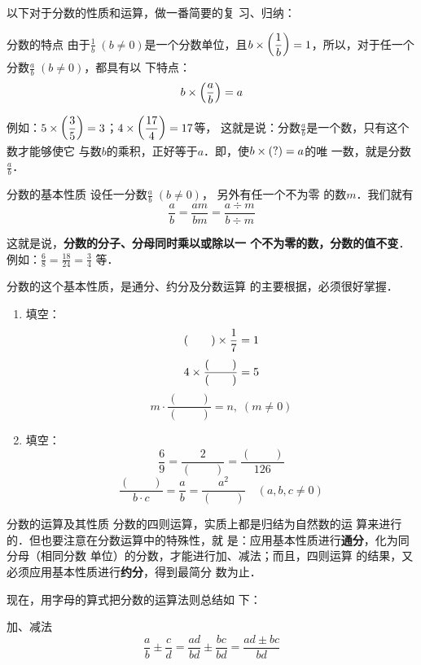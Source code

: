 以下对于分数的性质和运算，做一番简要的复
习、归纳：
\begin{blk}{分数的特点}
    由于$\frac{1}{b}\; (b\ne 0)$是一个分数单位，且$b\times\left(\dfrac{1}{b}\right)=1$，所以，对于任一个分数$\frac{a}{b}\; (b\ne 0)$，都具有以
    下特点：
    \[b\times\left(\dfrac{a}{b}\right)=a \]
\end{blk}

例如：$5\times\left(\dfrac{3}{5}\right)=3$；$4\times\left(\dfrac{17}{4}\right)=17$等，
这就是说：分数$\frac{a}{b}$是一个数，只有这个数才能够使它
与数$b$的乘积，正好等于$a$．即，使$b\times(?)=a$的唯
一数，就是分数$\frac{a}{b}$．

\begin{blk}{分数的基本性质}
    设任一分数$\frac{a}{b}\; (b\ne 0)$，
另外有任一个不为零
的数$m$．我们就有
\[\frac{a}{b}=\frac{am}{bm}=\frac{a\div m}{b\div m} \]
\end{blk}

这就是说，\textbf{分数的分子、分母同时乘以或除以一
个不为零的数，分数的值不变}．例如：$\frac{6}{8}=\frac{18}{24}=\frac{3}{4}$
等．

分数的这个基本性质，是通分、约分及分数运算
的主要根据，必须很好掌握．

\begin{ex}
    \begin{enumerate}
        \item 填空：\[(\qquad )\times \dfrac{1}{7}=1 \]\[4\times\dfrac{(\qquad)}{(\qquad )}=5\]\[m\cdot \frac{(\qquad)}{(\qquad )}=n,\; (m\ne 0)\]
        \item 填空：\[\frac{6}{9}=\frac{2}{(\qquad)}=\frac{(\qquad)}{126}\]\[\frac{(\qquad )}{b\cdot c}=\frac{a}{b}=\frac{a^2}{(\qquad )}\quad (a,b,c\ne 0)\]
    \end{enumerate}
\end{ex}


\begin{blk}{分数的运算及其性质}
    分数的四则运算，实质上都是归结为自然数的运
算来进行的．但也要注意在分数运算中的特殊性，就
是：应用基本性质进行\textbf{通分}，化为同分母（相同分数
单位）的分数，才能进行加、减法；而且，四则运算
的结果，又必须应用基本性质进行\textbf{约分}，得到最简分
数为止．
\end{blk}


现在，用字母的算式把分数的运算法则总结如
下：

\begin{blk}{加、减法}
    \[\frac{a}{b}\pm\frac{c}{d}=\frac{ad}{bd}\pm\frac{bc}{bd}=\frac{ad\pm bc}{bd} \]
\end{blk}

